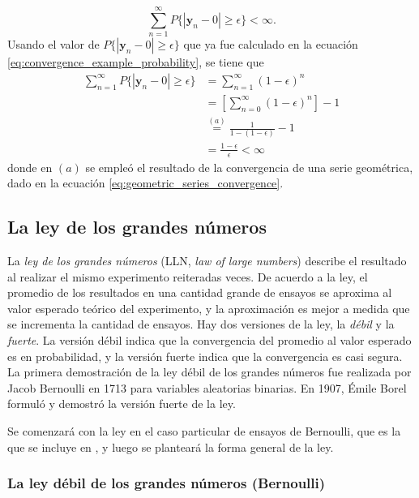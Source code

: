 \documentclass[a4paper]{report}
\newcommand{\y}{\mathbf{y}}
\begin{document}
\begin{itemize}
\[
 \sum_{n=1}^\infty P\{|\y_n-0|\geq\epsilon\}<\infty.
\]
Usando el valor de \(P\{|\y_n-0|\geq\epsilon\}\) que ya fue calculado en la ecuación \ref{eq:convergence_example_probability}, se tiene que
\begin{align*}
 \sum_{n=1}^\infty P\{|\y_n-0|\geq\epsilon\}&=\sum_{n=1}^\infty (1-\epsilon)^n\\
   &=\left[\sum_{n=0}^\infty (1-\epsilon)^n\right]-1\\
   &\overset{(a)}{=}\frac{1}{1-(1-\epsilon)}-1\\
   &=\frac{1-\epsilon}{\epsilon}<\infty
\end{align*}
donde en \((a)\) se empleó el resultado de la convergencia de una serie geométrica, dado en la ecuación \ref{eq:geometric_series_convergence}.
\end{itemize}

\subsection{La ley de los grandes números}\label{sec:lln}

La \emph{ley de los grandes números} (LLN, \emph{law of large numbers}) describe el resultado al realizar el mismo experimento reiteradas veces. De acuerdo a la ley, el promedio de los resultados en una cantidad grande de ensayos se aproxima al valor esperado teórico del experimento, y la aproximación es mejor a medida que se incrementa la cantidad de ensayos. Hay dos versiones de la ley, la \emph{débil} y la \emph{fuerte}. La versión débil indica que la convergencia del promedio al valor esperado es en probabilidad, y la versión fuerte indica que la convergencia es casi segura. 
La primera demostración de la ley débil de los grandes números fue realizada por Jacob Bernoulli en 1713 para variables aleatorias binarias. En 1907, Émile Borel formuló y demostró la versión fuerte de la ley.

Se comenzará con la ley en el caso particular de ensayos de Bernoulli, que es la que se incluye en \cite{papoulis2002probability}, y luego se planteará la forma general de la ley.

\subsubsection{La ley débil de los grandes números (Bernoulli)}
\end{document}
